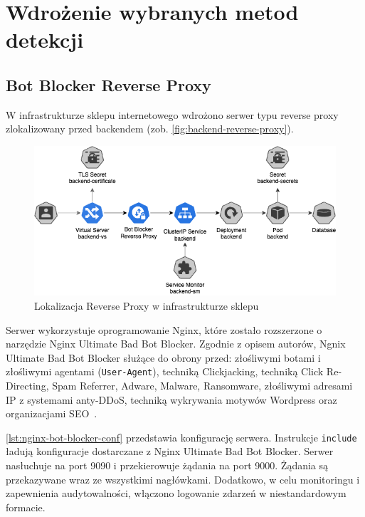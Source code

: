 \newpage


\section{Wdrożenie wybranych metod detekcji}\label{sec:wdrozenie-metod-detekcji}

\subsection{Bot Blocker Reverse Proxy}\label{subsec:reverse-proxy-impl}

W infrastrukturze sklepu internetowego wdrożono serwer typu reverse proxy zlokalizowany przed backendem (zob. \autoref{fig:backend-reverse-proxy}).

\begin{figure}[H]
    \centering
    \captionsetup{width=.8\linewidth}
    \includegraphics[width=\textwidth]{img/backend-reverse-proxy}
    \caption{Lokalizacja Reverse Proxy w infrastrukturze sklepu}
    \label{fig:backend-reverse-proxy}
\end{figure}

Serwer wykorzystuje oprogramowanie Nginx, które zostało rozszerzone o narzędzie Nginx Ultimate Bad Bot Blocker.
Zgodnie z opisem autorów, Ngnix Ultimate Bad Bot Blocker służące do obrony przed:
złośliwymi botami i złośliwymi agentami (\texttt{User-Agent}),
techniką Clickjacking, techniką Click Re-Directing,
Spam Referrer, Adware, Malware, Ransomware,
złośliwymi adresami IP z systemami anty-DDoS,
techniką wykrywania motywów Wordpress
oraz organizacjami SEO~\cite{nginx-ultimate-bad-bot-blocker}.

\autoref{lst:nginx-bot-blocker-conf} przedstawia konfigurację serwera.
Instrukcje \texttt{include} ładują konfiguracje dostarczane z Nginx Ultimate Bad Bot Blocker.
Serwer nasłuchuje na port 9090 i przekierowuje żądania na port 9000.
Żądania są przekazywane wraz ze wszystkimi nagłówkami.
Dodatkowo, w celu monitoringu i zapewnienia audytowalności, włączono logowanie zdarzeń w niestandardowym formacie.

